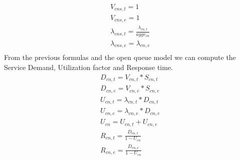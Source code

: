 \documentclass[11pt]{article}
\begin{document}
\begin{equation}
	\begin{array}{l}
		V_{cns, t} = 1 \\
		V_{cns, e} = 1 \\
		\lambda_{cns, t} = \frac{\lambda_{cn,t}}{aggr_{cn}} \\
		\lambda_{cns, e} = \lambda_{cn,e} \\
	\end{array}
\end{equation}
From the previous formulas and the open queue model we can compute the Service Demand, Utilization factor and Response time.
\begin{equation}
	\begin{array}{l}
		D_{cn, t} = V_{cn, t} * S_{cn, t} \\
		D_{cn, e} = V_{cn, e} * S_{cn, e} \\
		U_{cn, t} = \lambda_{cn, t} * D_{cn, t} \\
		U_{cn, e} = \lambda_{cn, e} * D_{cn, e} \\
		U_{cn} = U_{cn, t} + U_{cn, e} \\
		R_{cn, t} = \frac{D_{cn, t}}{1 - U_{cn}} \\
		R_{cn, e} = \frac{D_{cn, e}}{1 - U_{cn}} \\
	\end{array}
\end{equation}
\end{document}
